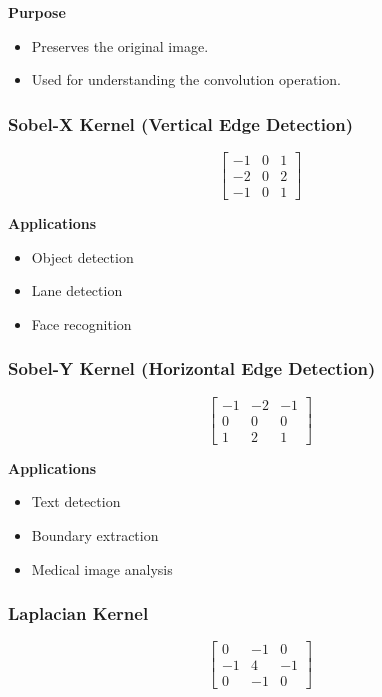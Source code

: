 \documentclass[12pt,a4paper]{article}
\begin{document}
\textbf{Purpose}

\begin{itemize}
    \item Preserves the original image.
    \item Used for understanding the convolution operation.
\end{itemize}

\subsubsection{Sobel-X Kernel (Vertical Edge Detection)}

\[
\begin{bmatrix}
-1&0&1\\
-2&0&2\\
-1&0&1
\end{bmatrix}
\]

\textbf{Applications}

\begin{itemize}
    \item Object detection
    \item Lane detection
    \item Face recognition
\end{itemize}

\subsubsection{Sobel-Y Kernel (Horizontal Edge Detection)}

\[
\begin{bmatrix}
-1&-2&-1\\
0&0&0\\
1&2&1
\end{bmatrix}
\]

\textbf{Applications}

\begin{itemize}
    \item Text detection
    \item Boundary extraction
    \item Medical image analysis
\end{itemize}

\subsubsection{Laplacian Kernel}

\[
\begin{bmatrix}
0&-1&0\\
-1&4&-1\\
0&-1&0
\end{bmatrix}
\]
\end{document}
